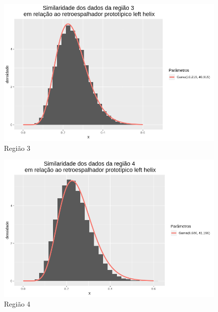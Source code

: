 \documentclass[12pt]{article}
\begin{document}
\begin{figure}[!h]
    \centering
    \vspace{0.1\linewidth}
    \includegraphics[width = \linewidth]{../../Images/Report_18_12_20/lh_region3.png}
    \caption{Região 3}
    \label{fig:lh_r3}
\end{figure}

\begin{figure}[!h]
    \centering
    \vspace{0.10\linewidth}
    \includegraphics[width = \linewidth]{../../Images/Report_18_12_20/lh_region4.png}
    \caption{Região 4}
    \label{fig:lh_r4}
\end{figure}
\end{document}
